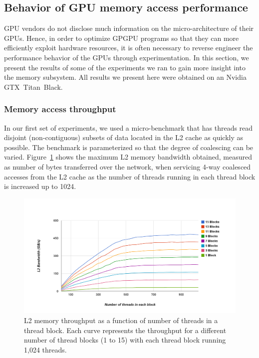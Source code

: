 \subsection{Behavior of GPU memory access performance}  \label{GPUBehavior}

GPU vendors do not disclose much information on the micro-architecture of their GPUs.
Hence, in order to optimize GPGPU programs so that they can more efficiently exploit hardware
resources, it is often necessary to reverse engineer the performance behavior of the GPUs through
experimentation.
In this section, we present the results of some of the experiments we ran to gain more insight into the memory subsystem.
All results we present here were obtained on an Nvidia GTX~Titan~Black.


\subsubsection{Memory access throughput}
In our first set of experiments, we used a micro-benchmark that has threads read disjoint (non-contiguous) subsets of data
located in the L2 cache as quickly as possible.
The benchmark is parameterized so that the degree of coalescing can be varied.
Figure~\ref{fig:MemBandwidth} shows the maximum L2 memory bandwidth obtained, measured as
number of bytes transferred over the network, when servicing 4-way coalesced
accesses from the L2 cache as the number of threads running in each thread block is increased up to
1024.



\begin{figure}
\center
\includegraphics[scale=0.20]{AllInL2MultipleSM4WayColaesced.png}
\caption{\footnotesize\textnormal{L2 memory throughput as a function of number of threads in a thread block. Each curve represents the throughput for a different number of thread blocks (1 to 15) with each thread block running 1,024 threads.}}
\label{fig:MemBandwidth}
\end{figure}

